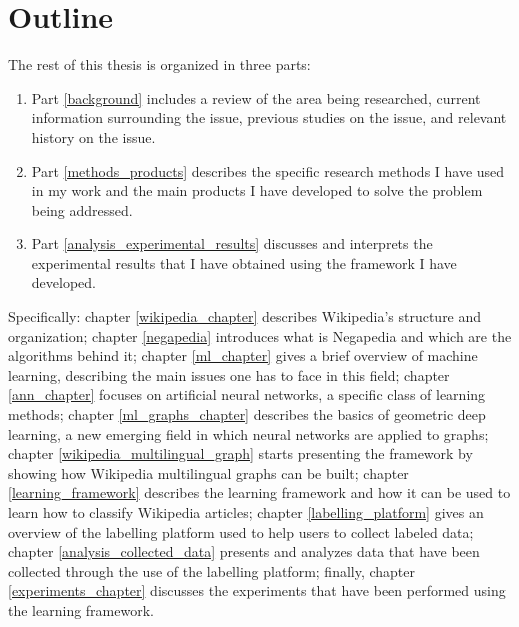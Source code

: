     \section{Outline}
        The rest of this thesis is organized in three parts:
        \begin{enumerate}
            \item Part \ref{background} includes a review of the area being researched, current information surrounding the issue, previous studies on the issue, and relevant history on the issue.
            \item Part \ref{methods_products} describes the specific research methods I have used in my work and the main products I have developed to solve the problem being addressed.
            \item Part \ref{analysis_experimental_results} discusses and interprets the experimental results that I have obtained using the framework I have developed.
        \end{enumerate}
        
        Specifically: chapter \ref{wikipedia_chapter} describes Wikipedia's structure and organization; chapter \ref{negapedia} introduces what is Negapedia and which are the algorithms behind it; chapter \ref{ml_chapter} gives a brief overview of machine learning, describing the main issues one has to face in this field; chapter \ref{ann_chapter} focuses on artificial neural networks, a specific class of learning methods; chapter \ref{ml_graphs_chapter} describes the basics of geometric deep learning, a new emerging field in which neural networks are applied to graphs; chapter \ref{wikipedia_multilingual_graph} starts presenting the framework by showing how Wikipedia multilingual graphs can be built; chapter \ref{learning_framework} describes the learning framework and how it can be used to learn how to classify Wikipedia articles; chapter \ref{labelling_platform} gives an overview of the labelling platform used to help users to collect labeled data; chapter \ref{analysis_collected_data} presents and analyzes data that have been collected through the use of the labelling platform; finally, chapter \ref{experiments_chapter} discusses the experiments that have been performed using the learning framework.
